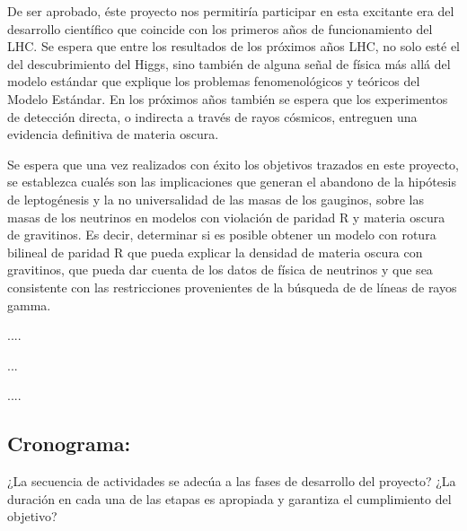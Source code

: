 De ser aprobado, éste proyecto nos permitiría participar en esta
excitante era del desarrollo científico que coincide con
los primeros años de funcionamiento del LHC.  Se espera que entre los
resultados de los próximos años LHC, no solo esté el del
descubrimiento del Higgs, sino también de alguna señal de física más
allá del modelo estándar que explique los problemas fenomenológicos y
teóricos del Modelo Estándar. En los próximos años también se espera
que los experimentos de detección directa, o indirecta a través de
rayos cósmicos, entreguen una evidencia definitiva de materia oscura.

\begin{gravitinodm}
  Se espera que una vez realizados con éxito los objetivos trazados en
  este proyecto, se establezca cualés son las implicaciones que
  generan el abandono de la hipótesis de leptogénesis y la no
  universalidad de las masas de los gauginos, sobre las masas de los
  neutrinos en modelos con violación de paridad R y materia oscura de
  gravitinos. Es decir, determinar si es posible obtener un modelo con
  rotura bilineal de paridad R que pueda explicar la densidad de
  materia oscura con gravitinos, que pueda dar cuenta de los datos de
  física de neutrinos y que sea consistente con las restricciones
  provenientes de la búsqueda de de líneas de rayos
  gamma.
\end{gravitinodm}

\begin{bbrpvlhc}
....  
\end{bbrpvlhc}

\begin{brpvlhc}
  ...
\end{brpvlhc}

\begin{darkmatter}
  ....
\end{darkmatter}


\subsection{Cronograma:                                    }
\begin{instrucciones}
  ¿La secuencia de actividades se adecúa a las fases de desarrollo del proyecto? ¿La duración en cada una de las etapas es apropiada y garantiza el cumplimiento del objetivo?
\end{instrucciones}


